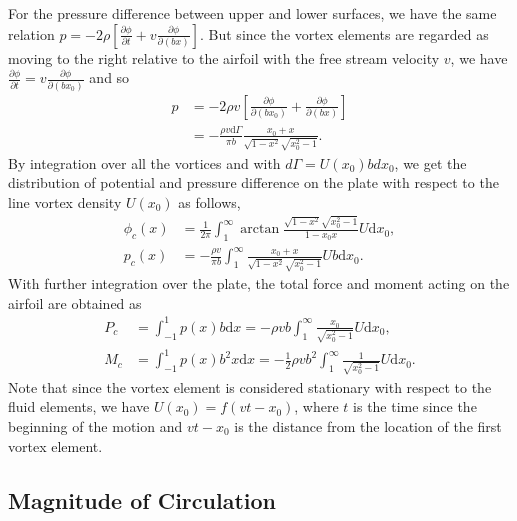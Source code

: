 For the pressure difference between upper and lower surfaces, we have the same relation $p = -2\rho[\frac{\partial \phi}{\partial t} + v\frac{\partial \phi}{\partial (bx)}]$.
But since the vortex elements are regarded as moving to the right relative to the airfoil with the free stream velocity $v$,  we have $\frac{\partial \phi}{\partial t} = v\frac{\partial \phi}{\partial (bx_0)}$ and so 
\begin{align}
p & = -2\rho v[\frac{\partial \phi}{\partial (bx_0)} + \frac{\partial \phi}{\partial (bx)}]  \\
  &  = -\frac{\rho v \mathrm{d}\Gamma}{\pi b} \frac{x_0+x}{\sqrt{1-x^2}\sqrt{x_0^2-1}}.
\end{align}
By integration over all the vortices and with $d\Gamma = U(x_0)bdx_0$, we get the distribution of potential and pressure difference on the plate with respect to the line vortex density $U(x_0)$ as follows,
\begin{align}
\phi_c(x) & =  \frac{1}{2\pi} \int_{1}^{\infty}\arctan \frac{\sqrt{1-x^2}\sqrt{x_0^2-1}}{1-x_0x}U\mathrm{d}x_0, \\
p_c(x) &  =  -\frac{\rho v }{\pi b} \int_{1}^{\infty}\frac{x_0+x}{\sqrt{1-x^2}\sqrt{x_0^2-1}} Ub\mathrm{d}x_0.
\end{align}
With further integration over the plate, the total force and moment acting on the airfoil are obtained as
\begin{align}
P_c & =  \int_{-1}^{1} p(x) b \mathrm{d}x
   =  -\rho v b \int_{1}^{\infty} \frac{x_0}{\sqrt{x_0^2-1}} U \mathrm{d}x_0, \\
M_c & =  \int_{-1}^{1} p(x) b^2 x \mathrm{d}x
   =   - \frac{1}{2} \rho v b^2 \int_{1}^{\infty} \frac{1}{\sqrt{x_0^2-1}} U \mathrm{d}x_0.
\end{align}
Note that since the vortex element is considered stationary with respect to the fluid elements, we have $U(x_0) = f(vt - x_0)$, where $t$ is the time since the beginning of the motion and $vt-x_0$ is the distance from the location of the first vortex element.


\subsection{Magnitude of Circulation}

